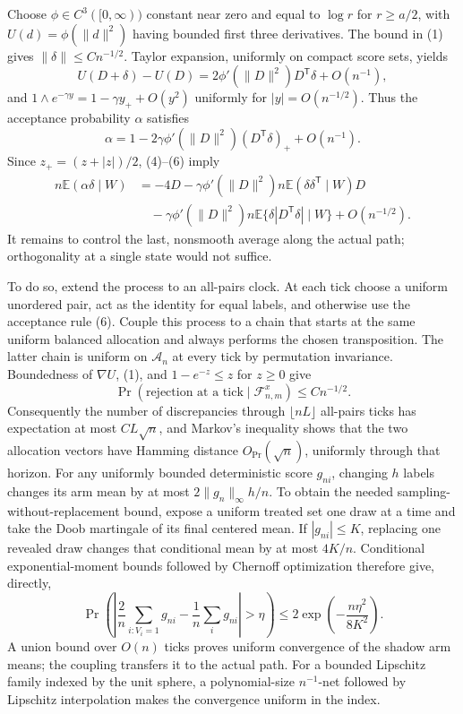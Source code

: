 Choose \(\phi\in C^3([0,\infty))\) constant near zero and equal to \(\log r\) for \(r\ge a/2\), with \(U(d)=\phi(\|d\|^2)\) having bounded first three derivatives.  The bound in (1) gives \(\|\delta\|\le Cn^{-1/2}\).  Taylor expansion, uniformly on compact score sets, yields
\[
 U(D+\delta)-U(D)=2\phi'(\|D\|^2)D^{\mathsf T}\delta+O(n^{-1}), \tag{5}
\]
and \(1\wedge e^{-\gamma y}=1-\gamma y_++O(y^2)\) uniformly for \(|y|=O(n^{-1/2})\).  Thus the acceptance probability \(\alpha\) satisfies
\[
 \alpha=1-2\gamma\phi'(\|D\|^2)(D^{\mathsf T}\delta)_++O(n^{-1}). \tag{6}
\]
Since \(z_+=(z+|z|)/2\), (4)--(6) imply
\[
 \begin{split}
 n\mathbb E(\alpha\delta\mid W)
 &=-4D-\gamma\phi'(\|D\|^2)n\mathbb E(\delta\delta^{\mathsf T}\mid W)D\\
 &\quad-\gamma\phi'(\|D\|^2)n\mathbb E\{\delta|D^{\mathsf T}\delta|\mid W\}+O(n^{-1/2}).
 \end{split} \tag{7}
\]
It remains to control the last, nonsmooth average along the actual path; orthogonality at a single state would not suffice.

To do so, extend the process to an all-pairs clock.  At each tick choose a uniform unordered pair, act as the identity for equal labels, and otherwise use the acceptance rule (6).  Couple this process to a chain that starts at the same uniform balanced allocation and always performs the chosen transposition.  The latter chain is uniform on \(\mathcal A_n\) at every tick by permutation invariance.  Boundedness of \(\nabla U\), (1), and \(1-e^{-z}\le z\) for \(z\ge0\) give
\[
 \Pr(\text{rejection at a tick}\mid\mathcal F^x_{n,m})\le Cn^{-1/2}. \tag{8}
\]
Consequently the number of discrepancies through \(\lfloor nL\rfloor\) all-pairs ticks has expectation at most \(CL\sqrt n\), and Markov's inequality shows that the two allocation vectors have Hamming distance \(O_{\Pr}(\sqrt n)\), uniformly through that horizon.  For any uniformly bounded deterministic score \(g_{ni}\), changing \(h\) labels changes its arm mean by at most \(2\|g_n\|_\infty h/n\).  To obtain the needed sampling-without-replacement bound, expose a uniform treated set one draw at a time and take the Doob martingale of its final centered mean.  If \(|g_{ni}|\le K\), replacing one revealed draw changes that conditional mean by at most \(4K/n\).  Conditional exponential-moment bounds followed by Chernoff optimization therefore give, directly,
\[
 \Pr\left(\left|\frac2n\sum_{i:V_i=1}g_{ni}-\frac1n\sum_i g_{ni}\right|>\eta\right)
 \le 2\exp\left(-\frac{n\eta^2}{8K^2}\right). \tag{9a}
\]
A union bound over \(O(n)\) ticks proves uniform convergence of the shadow arm means; the coupling transfers it to the actual path.  For a bounded Lipschitz family indexed by the unit sphere, a polynomial-size \(n^{-1}\)-net followed by Lipschitz interpolation makes the convergence uniform in the index.


